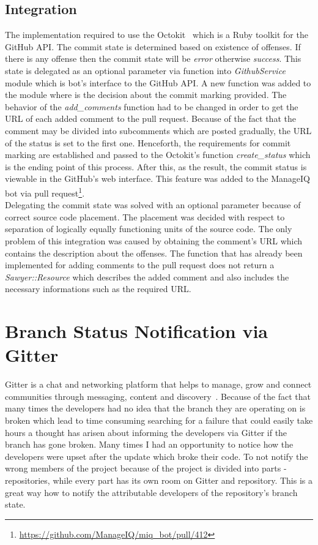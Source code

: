 \subsection{Integration}

The implementation required to use the Octokit~\cite{OCTOKIT} which is a Ruby toolkit for the GitHub API. The commit state is determined based on existence of offenses. If there is any offense then the commit state will be \textit{error} otherwise \textit{success}. This state is delegated as an optional parameter via function into \textit{GithubService} module which is bot's interface to the GitHub API. A new function was added to the module where is the decision about the commit marking provided. The behavior of the \textit{add\_comments} function had to be changed in order to get the URL of each added comment to the pull request. Because of the fact that the comment may be divided into subcomments which are posted gradually, the URL of the status is set to the first one. Henceforth, the requirements for commit marking are established and passed to the Octokit's function \textit{create\_status} which is the ending point of this process. After this, as the result, the commit status is viewable in the GitHub's web interface. This feature was added to the ManageIQ bot via pull request\footnote{\url{https://github.com/ManageIQ/miq_bot/pull/412}}.\\

Delegating the commit state was solved with an optional parameter because of correct source code placement. The placement was decided with respect to separation of logically equally functioning units of the source code. The only problem of this integration was caused by obtaining the comment's URL which contains the description about the offenses. The function that has already been implemented for adding comments to the pull request does not return a \textit{Sawyer::Resource} which describes the added comment and also includes the necessary informations such as the required URL.

\section{Branch Status Notification via Gitter}

Gitter is a chat and networking platform that helps to manage, grow and connect communities through messaging, content and discovery~\cite{GITTER}. Because of the fact that many times the developers had no idea that the branch they are operating on is broken which lead to time consuming searching for a failure that could easily take hours a thought has arisen about informing the developers via Gitter if the branch has gone broken. Many times I had an opportunity to notice how the developers were upset after the update which broke their code. To not notify the wrong members of the project because of the project is divided into parts - repositories, while every part has its own room on Gitter and repository. This is a great way how to notify the attributable developers of the repository's branch state.

